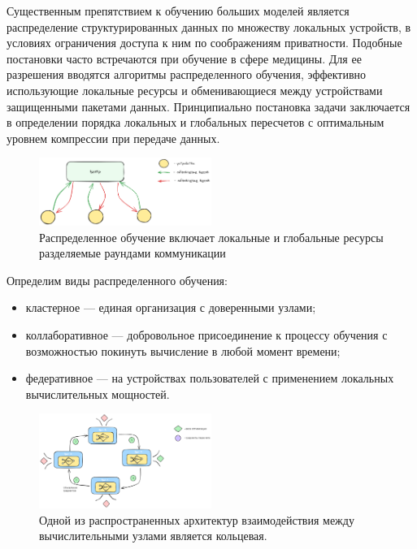 Существенным препятствием к обучению больших моделей является распределение структурированных данных по множеству
локальных устройств, в условиях ограничения доступа к ним по соображениям приватности. Подобные постановки часто встречаются
при обучение в сфере медицины. Для ее разрешения вводятся алгоритмы распределенного обучения, эффективно использующие
локальные ресурсы и обменивающиеся между устройствами защищенными пакетами данных. Принципиально постановка задачи
заключается в определении порядка локальных и глобальных пересчетов с оптимальным уровнем компрессии при передаче данных.

\begin{figure}[h]
    \centering
    \includegraphics[width=0.5\textwidth]{assets/math/distributed/distributed.excalidraw.png}
    \caption{Распределенное обучение включает локальные и глобальные ресурсы разделяемые раундами коммуникации }
    \label{distributed}
\end{figure}

Определим виды распределенного обучения:
 \begin{itemize}
    \item кластерное --- единая организация с доверенными узлами;
    \item коллаборативное --- добровольное присоединение к процессу обучения с возможностью покинуть 
          вычисление в любой момент времени;
    \item федеративное --- на устройствах пользователей с применением локальных вычислительных мощностей.
\end{itemize}

\begin{figure}[h]
    \centering
    \includegraphics[width=0.5\textwidth]{assets/math/distributed/ring.excalidraw.png}
    \caption{Одной из распространенных архитектур взаимодействия между вычислительными узлами является кольцевая.}
    \label{ring}
\end{figure}

